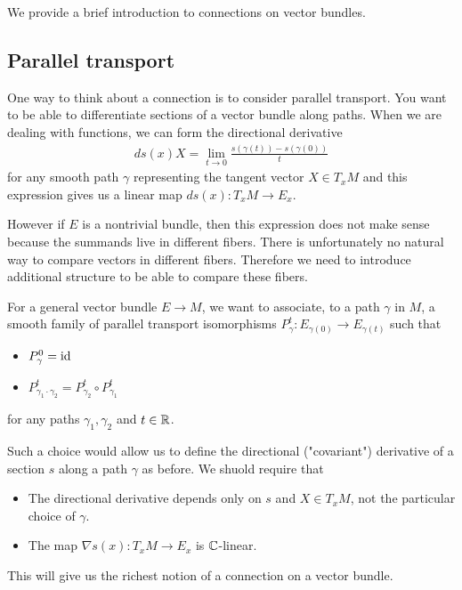 We provide a brief introduction to connections on vector bundles.
\subsection{Parallel transport}
One way to think about a connection is to consider parallel transport. You want to 
be able to differentiate sections of a vector bundle along paths. When we are dealing with functions,
we can form the directional derivative  \begin{align*}
    ds(x)X = \lim_{t\to 0}\frac{s(\gamma(t)) - s(\gamma(0))}{t}
\end{align*} for any smooth path $\gamma$ representing the tangent vector $X\in T_xM$ 
and this expression gives us a linear map $ds(x):T_xM\to E_x$.

\hfill 

However if $E$ is a nontrivial bundle, then this expression does not make sense because the
 summands live in different fibers. There is unfortunately no natural way to 
 compare vectors in different fibers. Therefore we need to introduce additional structure to 
 be able to compare these fibers.


\hfill

For a general vector bundle $E\to M$, we want to associate, to a path $\gamma$ in $M$, a smooth family of 
parallel transport isomorphisms $P^t_\gamma: E_{\gamma(0)}\to E_{\gamma(t)}$ such that \begin{itemize}
    \item $P^0_\gamma = \operatorname{id}$
    \item $P^t_{\gamma_1\cdot\gamma_2} = P^t_{\gamma_2}\circ P^t_{\gamma_1}$
\end{itemize} for any paths $\gamma_1,\gamma_2$ and $t\in\mathbb{R}$.

\hfill

Such a choice would allow us to define the directional ("covariant") derivative of a section $s$ along a path $\gamma$ 
as before. We shuold require that \begin{itemize}
    \item The directional derivative depends only on $s$ and $X\in T_xM$, not the particular 
    choice of $\gamma$.
    \item The map $\nabla s(x):T_xM\to E_x$ is $\mathbb{C}$-linear.
\end{itemize}
This will give us the richest notion of a connection on a vector bundle.
